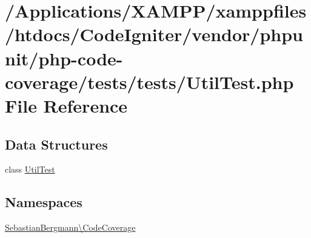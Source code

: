 \hypertarget{_util_test_8php}{}\section{/\+Applications/\+X\+A\+M\+P\+P/xamppfiles/htdocs/\+Code\+Igniter/vendor/phpunit/php-\/code-\/coverage/tests/tests/\+Util\+Test.php File Reference}
\label{_util_test_8php}
\subsection*{Data Structures}
\begin{DoxyCompactItemize}
\item 
class \mbox{\hyperlink{class_sebastian_bergmann_1_1_code_coverage_1_1_util_test}{Util\+Test}}
\end{DoxyCompactItemize}
\subsection*{Namespaces}
\begin{DoxyCompactItemize}
\item 
 \mbox{\hyperlink{namespace_sebastian_bergmann_1_1_code_coverage}{Sebastian\+Bergmann\textbackslash{}\+Code\+Coverage}}
\end{DoxyCompactItemize}
